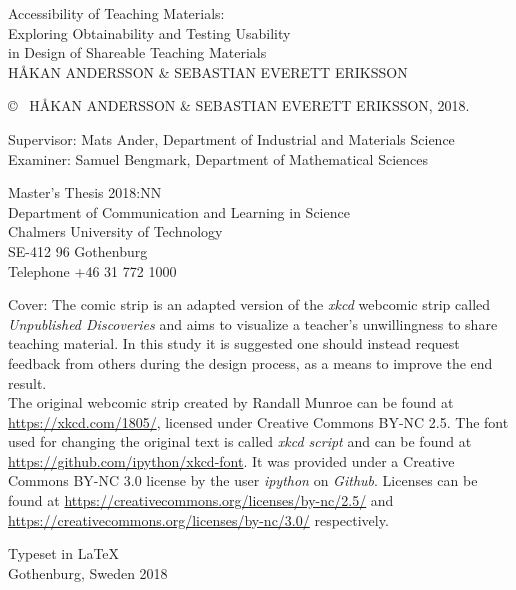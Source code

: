 \newpage
\thispagestyle{plain}
\vspace*{4.5cm}
Accessibility of Teaching Materials:\\
Exploring Obtainability and Testing Usability \\ in Design of Shareable Teaching Materials\\
HÅKAN ANDERSSON \& SEBASTIAN EVERETT ERIKSSON  \setlength{\parskip}{1cm}

\copyright ~ HÅKAN ANDERSSON \& SEBASTIAN EVERETT ERIKSSON, 2018. \setlength{\parskip}{1cm}

Supervisor: Mats Ander, Department of Industrial and Materials Science\\
Examiner: Samuel Bengmark, Department of Mathematical Sciences \setlength{\parskip}{1cm}

Master's Thesis 2018:NN\\	%
Department of Communication and Learning in Science\\
Chalmers University of Technology\\
SE-412 96 Gothenburg\\
Telephone +46 31 772 1000 \setlength{\parskip}{0.5cm}

\vfill
Cover: The comic strip is an adapted version of the \textit{xkcd} webcomic strip called \textit{Unpublished Discoveries} and aims to visualize a teacher's unwillingness to share teaching material. In this study it is suggested one should instead request feedback from others during the design process, as a means to improve the end result. \\
{\scriptsize The original webcomic strip created by Randall Munroe can be found at \url{https://xkcd.com/1805/}, licensed under Creative Commons BY-NC 2.5. The font used for changing the original text is called \textit{xkcd script} and can be found at \url{https://github.com/ipython/xkcd-font}. It was provided under a Creative Commons BY-NC 3.0 license by the user \textit{ipython} on \textit{Github}. Licenses can be found at \url{https://creativecommons.org/licenses/by-nc/2.5/} and \url{https://creativecommons.org/licenses/by-nc/3.0/} respectively.} \setlength{\parskip}{0.5cm}

Typeset in \LaTeX \\
Gothenburg, Sweden 2018

